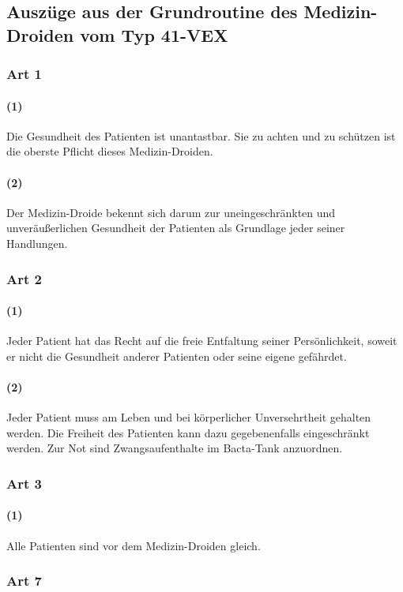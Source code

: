 \subsection{Auszüge aus der Grundroutine des Medizin-Droiden vom Typ 41-VEX}

\subsubsection{Art 1}
\paragraph{(1)} Die Gesundheit des Patienten ist unantastbar. Sie zu achten und zu schützen ist die oberste Pflicht dieses Medizin-Droiden.
\paragraph{(2)} Der Medizin-Droide bekennt sich darum zur uneingeschränkten und unveräußerlichen Gesundheit der Patienten als Grundlage jeder seiner Handlungen.

\subsubsection{Art 2}
\paragraph{(1)} Jeder Patient hat das Recht auf die freie Entfaltung seiner Persönlichkeit, soweit er nicht die Gesundheit anderer Patienten oder seine eigene gefährdet.
\paragraph{(2)} Jeder Patient muss am Leben und bei körperlicher Unversehrtheit gehalten werden. Die Freiheit des Patienten kann dazu gegebenenfalls eingeschränkt werden. Zur Not sind Zwangsaufenthalte im Bacta-Tank anzuordnen.


\subsubsection{Art 3}
\paragraph{(1)} Alle Patienten sind vor dem Medizin-Droiden gleich.

\subsubsection{Art 7}
